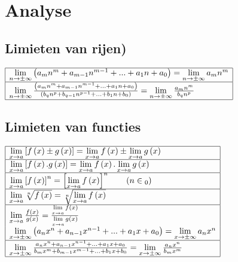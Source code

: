 \documentclass[a5paper]{article}
\begin{document}
\newpage

\section{Analyse}
\subsection{Limieten van rijen)}
\fontsize{14pt}{15pt}\selectfont
$\begin{array}{|l|}
\hline
\mathop {\lim }\limits_{n \to  \pm \infty } \left( {{a_m}{n^m} + {a_{m - 1}}{n^{m - 1}} + ... + {a_1}n + {a_0}} \right) = \mathop {\lim }\limits_{n \to  \pm \infty } {a_m}{n^m}\\
\hline
\mathop {\lim }\limits_{n \to  \pm \infty } \frac{{\left( {{a_m}{n^m} + {a_{m - 1}}{n^{m - 1}} + ... + {a_1}n + {a_0}} \right)}}{{\left( {{b_q}{n^p} + {b_{q - 1}}{n^{p - 1}} + ... + {b_1}n + {b_0}} \right)}} = \mathop {\lim }\limits_{n \to  \pm \infty } \frac{{{a_m}{n^m}}}{{{b_q}{n^p}}} \\
\hline
\end{array}$
\normalsize
\subsection{Limieten van functies}
\fontsize{14pt}{15pt}\selectfont
$\begin{array}{|l|}
\hline
\mathop {\lim }\limits_{x \to a} \left[ {f\left( x \right) \pm g\left( x \right)} \right] = \mathop {\lim }\limits_{x \to a} f\left( x \right) \pm \mathop {\lim }\limits_{x \to a} g\left( x \right)\\
\hline
\mathop {\lim }\limits_{x \to a} \left[ {f\left( x \right).g\left( x \right)} \right] = \mathop {\lim }\limits_{x \to a} f\left( x \right).\mathop {\lim }\limits_{x \to a} g\left( x \right)\\
\hline
\mathop {\lim }\limits_{x \to a} {\left[ {f\left( x \right)} \right]^n} = {\left[ {\mathop {\lim }\limits_{x \to a} f\left( x \right)} \right]^n}\quad \quad \left( {n \in {_0}} \right)\\
\hline
\mathop {\lim }\limits_{x \to a} \sqrt[n]{{f\left( x \right)}} = \sqrt[n]{{\mathop {\lim }\limits_{x \to a} f\left( x \right)}}\\
\hline
\mathop {\lim }\limits_{x \to a} \frac{{f\left( x \right)}}{{g\left( x \right)}} = \frac{{\mathop {\lim }\limits_{x \to a} f\left( x \right)}}{{\mathop {\lim }\limits_{x \to a} g\left( x \right)}}\\
\mathop {\lim }\limits_{x \to  \pm \infty } \left( {{a_n}{x^n} + {a_{n - 1}}{x^{n - 1}} + ... + {a_1}x + {a_0}} \right) = \mathop {\lim }\limits_{x \to  \pm \infty } {a_n}{x^n}\\
\hline
\mathop {\lim }\limits_{x \to  \pm \infty } \frac{{{a_n}{x^n} + {a_{n - 1}}{x^{n - 1}} + ... + {a_1}x + {a_0}}}{{{b_m}{x^m} + {b_{m - 1}}{x^{m - 1}} + ... + {b_1}x + {b_0}}} = \mathop {\lim }\limits_{x \to  \pm \infty } \frac{{{a_n}{x^n}}}{{{b_m}{x^m}}} \\
\hline
\end{array}$
\end{document}
